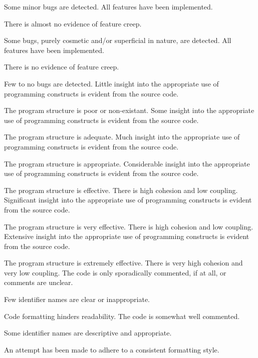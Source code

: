\begin{markingrubric}
            \par Some minor bugs  are detected.
        \grade All features have been implemented.
            \par There is almost no evidence of feature creep.
            \par Some bugs, purely cosmetic and/or superficial in nature, are detected.
        \grade All features have been implemented.
            \par There is no evidence of feature creep.
            \par Few to no bugs are detected.
%
        \grade \fail Little insight into the appropriate use of programming constructs is evident from the source code.
            \par The program structure is poor or non-existant.
        \grade Some insight into the appropriate use of programming constructs is evident from the source code.
            \par The program structure is adequate.
        \grade Much insight into the appropriate use of programming constructs is evident from the source code.
            \par The program structure is appropriate.
        \grade Considerable insight into the appropriate use of programming constructs is evident from the source code.
            \par The program structure is effective. There is high cohesion and low coupling.
        \grade Significant insight into the appropriate use of programming constructs is evident from the source code.
            \par The program structure is very effective. There is high cohesion and low coupling.
        \grade Extensive insight into the appropriate use of programming constructs is evident from the source code.
            \par The program structure is extremely effective. There is very high cohesion and very low coupling.
%
        \grade \fail The code is only sporadically commented, if at all, or comments are unclear.
            \par Few identifier names are clear or inappropriate.
            \par Code formatting hinders readability.
        \grade The code is somewhat well commented.
            \par Some identifier names are descriptive and appropriate.
            \par An attempt has been made to adhere to a consistent formatting style.

\end{markingrubric}
